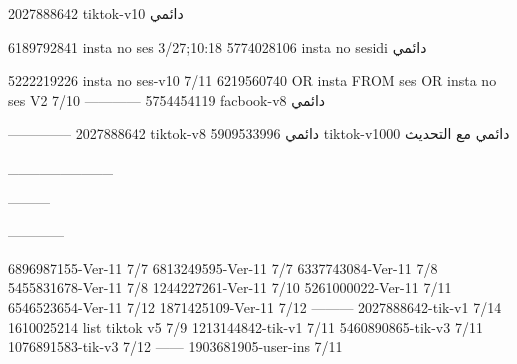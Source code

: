 2027888642 tiktok-v10
دائمي

6189792841 insta no ses
3/27;10:18
5774028106 insta no sesidi
دائمي

5222219226 insta no ses-v10
7/11
6219560740 OR insta FROM ses OR insta no ses V2
7/10
------------
5754454119 facbook-v8
دائمي


--------------
2027888642 tiktok-v8
دائمي
5909533996 tiktok-v1000
دائمي مع التحديث

__________

---------

------------

6896987155-Ver-11
7/7
6813249595-Ver-11
7/7
6337743084-Ver-11
7/8
5455831678-Ver-11
7/8
1244227261-Ver-11
7/10
5261000022-Ver-11
7/11
6546523654-Ver-11
7/12
1871425109-Ver-11
7/12
---------
2027888642-tik-v1
7/14
1610025214 list tiktok v5
7/9
1213144842-tik-v1
7/11
5460890865-tik-v3
7/11
1076891583-tik-v3
7/12
------
1903681905-user-ins
7/11
